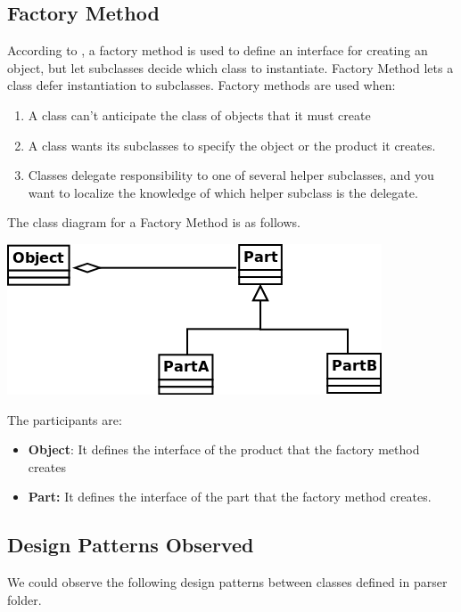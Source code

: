\documentclass[•]{book}
\begin{document}
\subsection{Factory Method}
According to \cite{gamma1994}, a factory method is used to define an interface for creating an object, but let subclasses decide which class to instantiate. Factory Method lets a
class defer instantiation to subclasses.
 Factory methods are used when:
 \begin{enumerate}
 \item A class can't anticipate the class of objects that it must create
 \item A class wants its subclasses to specify the object or the product it creates.
 \item Classes delegate responsibility to one of several helper subclasses, and you want to localize the knowledge of
which helper subclass is the delegate.
 \end{enumerate}
 
 The class diagram for a Factory Method is as follows.
 \begin{center}
 \includegraphics[scale=0.5]{FactoryMethod.png}
 \end{center}
 
 The participants are:
 \begin{itemize}
 \item \textbf{Object}: It defines the interface of the product that the factory method creates
 \item \textbf{Part:} It defines the interface of the part that the factory method creates.

 \end{itemize}

\subsection{Design Patterns Observed}

We could observe the following design patterns between classes defined in parser folder.
\end{document}
